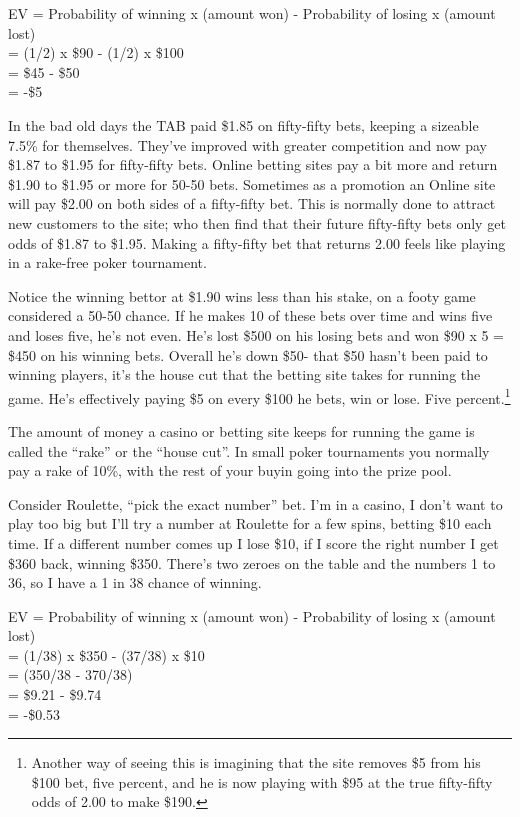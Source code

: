 EV = Probability of winning x (amount won) - Probability of losing x
(amount lost) \\
   = (1/2) x \$90 - (1/2) x \$100 \\
   = \$45 - \$50  \\
   = -\$5

In the bad old days
the TAB paid \$1.85 on fifty-fifty bets, keeping a sizeable 7.5\% for
themselves. They've improved with greater competition and now pay
\$1.87 to \$1.95 for fifty-fifty bets. Online betting sites pay a bit
more and return \$1.90 to \$1.95 or more for 50-50 bets. Sometimes as
a promotion an Online site will pay \$2.00 on both sides of a
fifty-fifty bet. This is normally done to attract new customers to the
site; who then find that their future fifty-fifty bets only get odds
of \$1.87 to \$1.95. Making a fifty-fifty bet that returns 2.00 feels like
playing in a rake-free poker tournament.


Notice the winning bettor at \$1.90 wins less than his stake,
on a footy game considered a 50-50 chance. If he makes 10 of these
bets over time and wins five and loses five, he's not even. He's lost
\$500 on his losing bets and won \$90 x 5 = \$450 on his winning bets.
Overall he's down \$50- that \$50 hasn't been paid to winning players,
it's the house cut that the betting site takes for running the game.
He's effectively paying \$5 on every \$100 he bets, win or lose.
Five percent.\footnote{Another way of seeing this is imagining that the
site removes \$5 from his \$100 bet, five percent, and he is now
playing with \$95 at the true fifty-fifty odds of 2.00 to make \$190.}

The amount of money a casino or betting site keeps for running the
game is called the ``rake'' or the ``house cut''.
In small poker tournaments you normally pay a rake of 10\%, with the
rest of your buyin going into the prize pool.

Consider Roulette, ``pick the exact number'' bet. I'm in a casino,
I don't want to play too big but I'll try a number at Roulette for a few
spins, betting \$10 each time. If a different number comes up I lose \$10,
if I score the right number I get \$360 back, winning \$350. There's two
zeroes on the table and the numbers 1 to 36, so I have a 1 in 38 chance of
winning.

EV = Probability of winning x (amount won) - Probability of losing x
(amount lost) \\
   = (1/38) x \$350 - (37/38) x \$10 \\
   = (350/38 - 370/38)  \\
   = \$9.21 - \$9.74 \\
   = -\$0.53


